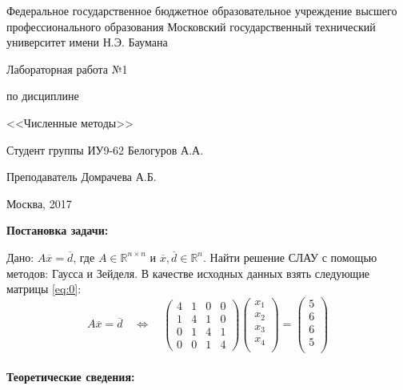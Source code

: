 \documentclass[a4paper, 12pt]{article}   	%
\begin{document}
\begin{titlepage}

\thispagestyle{empty}

\begin{center}
Федеральное государственное бюджетное образовательное учреждение высшего профессионального образования Московский государственный технический университет имени Н.Э. Баумана
\end{center}


\vfill

\centerline{\large{Лабораторная работа №1}}
\centerline{\large{по дисциплине}}
\centerline{\large{<<Численные методы>>}}

\vfill

Студент группы ИУ9-62 \hfill Белогуров А.А.

Преподаватель \hfill Домрачева А.Б.
\vfill

\centerline{Москва, 2017}
\clearpage
\end{titlepage}

\newpage
\setcounter{page}{2}
 \textbf{Постановка задачи:}

Дано: $A\overline{x}=\overline{d}$, где $A \in \mathds{R}^{n \times n}$ и $ \overline{x},\overline{d} \in \mathds{R}^{n}$. Найти решение СЛАУ с помощью методов: Гаусса и Зейделя. В качестве исходных данных взять следующие матрицы \eqref{eq:0}:
\begin{equation}\label{eq:0}
A\overline{x}=\overline{d}
\quad   \Leftrightarrow \quad
\left(\begin{array}{cccc} 
4 & 1 & 0 & 0 \\
1 & 4 & 1 & 0 \\
0 & 1 & 4 & 1 \\
0 & 0 & 1 & 4  
\end{array}\right)
\left(\begin{array}{c} 
x_1 \\
x_2 \\
x_3 \\
x_4 \\
\end{array}\right)
 =
 \left(\begin{array}{c} 
5 \\
6 \\
6 \\
5 \\
\end{array}\right)
\end{equation}
\\

\textbf{Теоретические сведения:}
\end{document}
